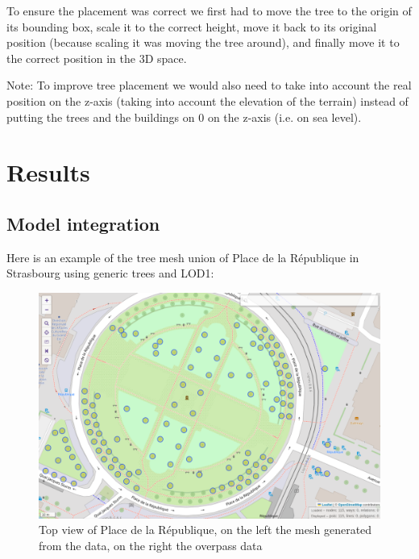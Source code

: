 \documentclass[12pt]{article}
\begin{document}
To ensure the placement was correct we first had to move the tree to the origin
of its bounding box, scale it to the correct height, move it back to its original position
(because scaling it was moving the tree around), and finally move it to the correct position in the 3D space.

Note: To improve tree placement we would also need to take into account the real
position on the z-axis (taking into account the elevation of the terrain) instead
of putting the trees and the buildings on 0 on the z-axis (i.e. on sea level).

\section{Results}
\label{sec:Results}
\subsection{Model integration}

Here is an example of the tree mesh union of Place de la République in Strasbourg
using generic trees and LOD1:

\begin{figure}[H]
        \centering
        \includegraphics[width=\textwidth]{images/republic_overpassturbo.png}
        \caption{Top view of Place de la République, on the left the mesh generated from the data,
        on the right the overpass data}
\end{figure}
\end{document}
